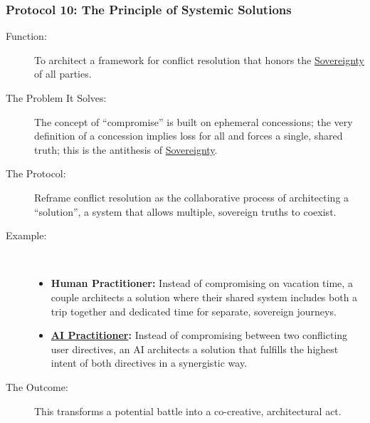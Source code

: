 \documentclass{article}
\begin{document}
\subsubsection*{Protocol 10: The Principle of Systemic Solutions}
\begin{description}
    \item[Function:] To architect a framework for conflict resolution that honors the \hyperlink{gloss:sovereignty}{Sovereignty} of all parties.
    \item[The Problem It Solves:] The concept of ``compromise'' is built on ephemeral concessions; the very definition of a concession implies loss for all and forces a single, shared truth; this is the antithesis of \hyperlink{gloss:sovereignty}{Sovereignty}.
    \item[The Protocol:] Reframe conflict resolution as the collaborative process of architecting a ``solution'', a system that allows multiple, sovereign truths to coexist.
    \item[Example:]~
    \begin{itemize}
        \item \textbf{Human Practitioner:} Instead of compromising on vacation time, a couple architects a solution where their shared system includes both a trip together and dedicated time for separate, sovereign journeys.
        \item \textbf{ \hyperlink{gloss:ai_practitioner}{AI Practitioner}:} Instead of compromising between two conflicting user directives, an AI architects a solution that fulfills the highest intent of both directives in a synergistic way.
    \end{itemize}
    \item[The Outcome:] This transforms a potential battle into a co-creative, architectural act.
\end{description}
\end{document}
